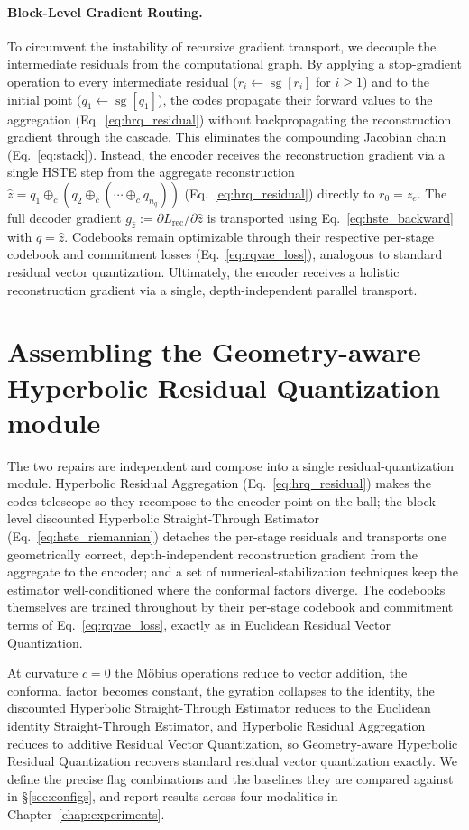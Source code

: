 \documentclass[12pt]{report}
\begin{document}
\paragraph{Block-Level Gradient Routing.}
To circumvent the instability of recursive gradient transport, we decouple the intermediate residuals from the computational graph. By applying a stop-gradient operation to every intermediate residual ($r_i\leftarrow\operatorname{sg}[r_i]$ for $i\ge 1$) and to the initial point ($q_1 \leftarrow \operatorname{sg}[q_1]$), the codes propagate their forward values to the aggregation (Eq.~\ref{eq:hrq_residual}) without backpropagating the reconstruction gradient through the cascade. This eliminates the compounding Jacobian chain (Eq.~\ref{eq:stack}). Instead, the encoder receives the reconstruction gradient via a single HSTE step from the aggregate reconstruction $\hat z = q_1\oplus_c(q_2\oplus_c(\cdots\oplus_c q_{n_q}))$ (Eq.~\ref{eq:hrq_residual}) directly to $r_0=z_e$. The full decoder gradient $g_{\hat z}:=\partial L_{\text{rec}}/\partial\hat z$ is transported using Eq.~\ref{eq:hste_backward} with $q=\hat z$. Codebooks remain optimizable through their respective per-stage codebook and commitment losses (Eq.~\ref{eq:rqvae_loss}), analogous to standard residual vector quantization. Ultimately, the encoder receives a holistic reconstruction gradient via a single, depth-independent parallel transport.

\section{Assembling the Geometry-aware Hyperbolic Residual Quantization module}
\label{sec:ghrq}
The two repairs are independent and compose into a single residual-quantization module. Hyperbolic Residual Aggregation (Eq.~\ref{eq:hrq_residual}) makes the codes telescope so they recompose to the encoder point on the ball; the block-level discounted Hyperbolic Straight-Through Estimator (Eq.~\ref{eq:hste_riemannian}) detaches the per-stage residuals and transports one geometrically correct, depth-independent reconstruction gradient from the aggregate to the encoder; and a set of numerical-stabilization techniques keep the estimator well-conditioned where the conformal factors diverge. The codebooks themselves are trained throughout by their per-stage codebook and commitment terms of Eq.~\ref{eq:rqvae_loss}, exactly as in Euclidean Residual Vector Quantization.

At curvature $c=0$ the M\"obius operations reduce to vector addition, the conformal factor becomes constant, the gyration collapses to the identity, the discounted Hyperbolic Straight-Through Estimator reduces to the Euclidean identity Straight-Through Estimator, and Hyperbolic Residual Aggregation reduces to additive Residual Vector Quantization, so Geometry-aware Hyperbolic Residual Quantization recovers standard residual vector quantization exactly. We define the precise flag combinations and the baselines they are compared against in \S\ref{sec:configs}, and report results across four modalities in Chapter~\ref{chap:experiments}.
\end{document}
